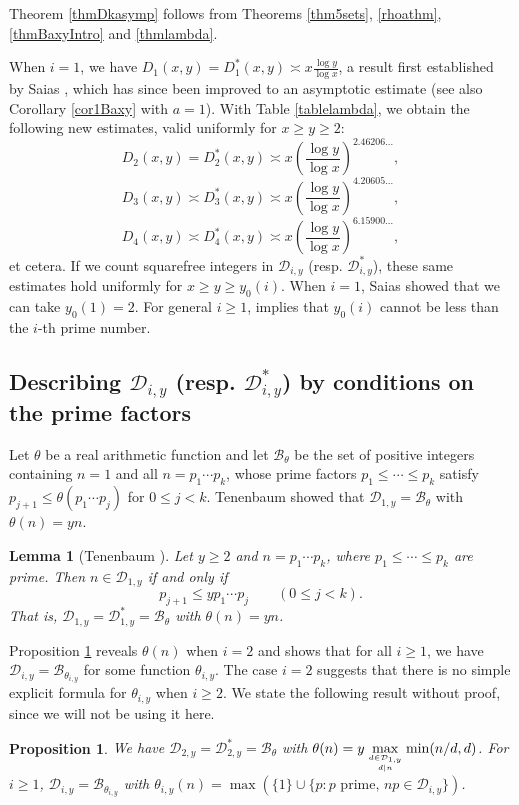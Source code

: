 \documentclass[11pt]{amsart}
\newtheorem{proposition}{Proposition}
\newtheorem{lemma}{Lemma}
\begin{document}
Theorem \ref{thmDkasymp} follows from Theorems \ref{thm5sets}, \ref{rhoathm}, \ref{thmBaxyIntro} and \ref{thmlambda}.

When $i=1$, we have $D_1(x,y)=D^*_1(x,y) \asymp x \frac{\log y}{\log x}$, a result first established by Saias \cite[Thm. 1]{Saias1},
which has since been improved to an asymptotic estimate \cite{PDD} (see also Corollary \ref{cor1Baxy} with $a=1$).
With Table \ref{tablelambda}, we obtain the following new estimates, valid uniformly for $x\ge y\ge 2$:
$$
D_2(x,y)=D^*_2(x,y)\asymp x  \left(\frac{\log y }{\log x}\right)^{2.46206...},
$$
$$
D_3(x,y)\asymp D^*_3(x,y)\asymp x  \left(\frac{\log y }{\log x}\right)^{4.20605...},
$$
$$
D_4(x,y)\asymp D^*_4(x,y)\asymp x  \left(\frac{\log y }{\log x}\right)^{6.15900...},
$$
et cetera. If we count squarefree integers in $\mathcal{D}_{i,y}$ (resp. $\mathcal{D}^*_{i,y}$), 
these same estimates hold uniformly for $x\ge y \ge y_0(i)$. When $i=1$, Saias \cite[Thm. 1]{Saias1} showed that we can take $y_0(1)=2$. 
For general $i\ge 1$, \cite[Lemma 2.2, Part 4]{Sar} implies that $y_0(i)$ cannot be less than the $i$-th prime number.




\subsection{Describing $ \mathcal{D}_{i,y}$ (resp. $ \mathcal{D}^*_{i,y}$) by conditions on the prime factors}\label{subsecBtheta}


Let $\theta$ be a real arithmetic function and let $\mathcal{B}_\theta$ be the set of positive integers containing $n=1$ and all $n=p_1\cdots p_k$, 
whose prime factors $p_1\le \cdots \le p_k$ satisfy $p_{j+1} \le \theta ( p_1\cdots p_{j})$  for $0\le j < k$. 
Tenenbaum \cite{Ten86} showed that  $\mathcal{D}_{1,y} =\mathcal{B}_\theta$ with $\theta(n)=yn$. 


\begin{lemma}[Tenenbaum \cite{Ten86}]\label{lemTen}
Let $y\ge 2$ and $n=p_1 \cdots p_k$, where $p_1\le \cdots \le p_k$ are prime. Then $n \in \mathcal{D}_{1,y}$ if and only if 
\begin{equation*}\label{pcond}
p_{j+1} \le y  p_1 \cdots p_j \qquad (0\le j<k).
\end{equation*}
That is, $ \mathcal{D}_{1,y} =\mathcal{D}_{1,y}^* = \mathcal{B}_\theta$ with $\theta(n)=yn$. 
\end{lemma}

Proposition \ref{thmi2} reveals $\theta(n)$ when $i=2$ and shows that  for all $i\ge 1$, we have $ \mathcal{D}_{i,y} = \mathcal{B}_{\theta_{i,y}}$ for some function $\theta_{i,y}$.
The case $i=2$ suggests that there is no simple explicit formula for  $\theta_{i,y}$ when $i\ge 2$.
We state the following result without proof, since we will not be using it here.
\begin{proposition}\label{thmi2}
We have
 $ \mathcal{D}_{2,y} =\mathcal{D}^*_{2,y} = \mathcal{B}_\theta$ with $\theta(n) = y \max\limits_{d \in \mathcal{D}_{1,y} \atop d| n} \min(n/d,d)$.
For $i\ge 1$,  $ \mathcal{D}_{i,y} = \mathcal{B}_{\theta_{i,y}}$ with $\theta_{i,y}(n) =\max(\{1\}\cup \{p: p \text{ prime, } np \in\mathcal{D}_{i,y}\})$.
\end{proposition}
\end{document}
